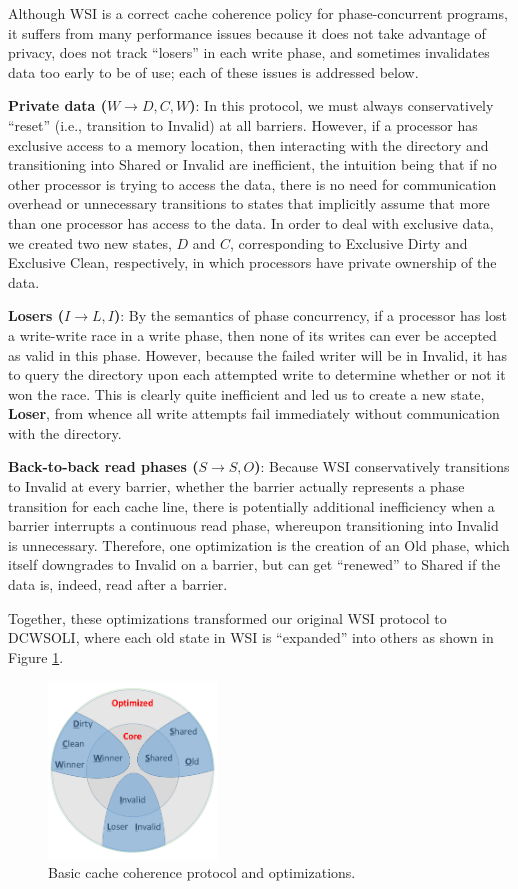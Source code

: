 \documentclass{article}
\begin{document}
Although WSI is a correct cache coherence policy for phase-concurrent programs, it suffers from many performance issues because it does not take advantage of privacy, does not track ``losers'' in each write phase, and sometimes invalidates data too early to be of use; each of these issues is addressed below.

\textbf{Private data ($W \rightarrow D, C, W$)}:
In this protocol, we must always conservatively ``reset'' (i.e., transition to Invalid) at all barriers. However, if a processor has exclusive access to a memory location, then interacting with the directory and transitioning into Shared or Invalid are inefficient, the intuition being that if no other processor is trying to access the data, there is no need for communication overhead or unnecessary transitions to states that implicitly assume that more than one processor has access to the data. In order to deal with exclusive data, we created two new states, $D$ and $C$, corresponding to Exclusive Dirty and Exclusive Clean, respectively, in which processors have private ownership of the data.

\textbf{Losers ($I \rightarrow L, I$)}:
By the semantics of phase concurrency, if a processor has lost a write-write race in a write phase, then none of its writes can ever be accepted as valid in this phase. However, because the failed writer will be in Invalid, it has to query the directory upon each attempted write to determine whether or not it won the race. This is clearly quite inefficient and led us to create a new state, \textbf{Loser}, from whence all write attempts fail immediately without communication with the directory.

\textbf{Back-to-back read phases ($S \rightarrow S, O$)}:
Because WSI conservatively transitions to Invalid at every barrier, whether the barrier actually represents a phase transition for each cache line, there is potentially additional inefficiency when a barrier interrupts a continuous read phase, whereupon transitioning into Invalid is unnecessary. Therefore, one optimization is the creation of an Old phase, which itself downgrades to Invalid on a barrier, but can get ``renewed'' to Shared if the data is, indeed, read after a barrier.

Together, these optimizations transformed our original WSI protocol to DCWSOLI, where each old state in WSI is ``expanded'' into others as shown in Figure \ref{wsi-to-dcwsoli}.

\begin{figure}[H]
\centering
\includegraphics[width=0.4\textwidth]{img/posterfig2.png}
\caption{Basic cache coherence protocol and optimizations.}
\label{wsi-to-dcwsoli}
\end{figure}
\end{document}
